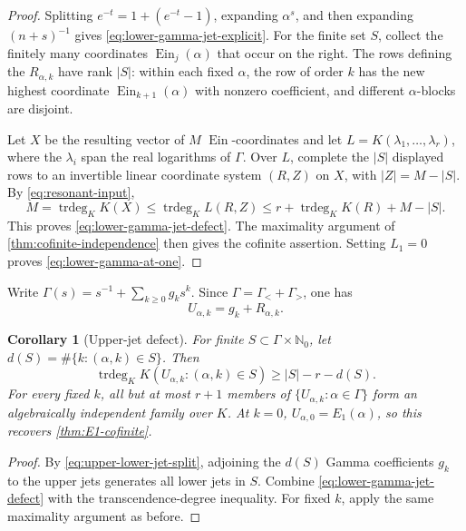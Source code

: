 \documentclass[11pt]{article}
\newtheorem{corollary}[theorem]{Corollary}
\theoremstyle{definition}
\theoremstyle{remark}
\newcommand{\N}{\mathbb N}
\newcommand{\Ein}{\operatorname{Ein}}
\newcommand{\trdeg}{\operatorname{trdeg}}
\begin{document}
\begin{proof}
Splitting \(e^{-t}=1+(e^{-t}-1)\), expanding \(\alpha^s\), and then
expanding \((n+s)^{-1}\) gives \eqref{eq:lower-gamma-jet-explicit}.
For the finite set \(S\), collect the finitely many coordinates
\(\Ein_j(\alpha)\) that occur on the right.  The rows defining the
\(R_{\alpha,k}\) have rank \(|S|\): within each fixed \(\alpha\), the row
of order \(k\) has the new highest coordinate \(\Ein_{k+1}(\alpha)\) with
nonzero coefficient, and different \(\alpha\)-blocks are disjoint.

Let \(X\) be the resulting vector of \(M\) \(\Ein\)-coordinates and let
\(L=K(\lambda_1,\ldots,\lambda_r)\), where the \(\lambda_i\) span the real
logarithms of \(\Gamma\).  Over \(L\), complete the \(|S|\) displayed rows
to an invertible linear coordinate system \((R,Z)\) on \(X\), with
\(|Z|=M-|S|\).  By \eqref{eq:resonant-input},
\[
 M=\trdeg_KK(X)
 \le\trdeg_KL(R,Z)
 \le r+\trdeg_KK(R)+M-|S|.
\]
This proves \eqref{eq:lower-gamma-jet-defect}.  The maximality argument of
\cref{thm:cofinite-independence} then gives the cofinite assertion.
Setting \(L_1=0\) proves \eqref{eq:lower-gamma-at-one}.
\end{proof}

Write \(\Gamma(s)=s^{-1}+\sum_{k\ge0}g_ks^k\).  Since
\(\Gamma=\Gamma_<+\Gamma_>\), one has
\begin{equation}\label{eq:upper-lower-jet-split}
 U_{\alpha,k}=g_k+R_{\alpha,k}.
\end{equation}

\begin{corollary}[Upper-jet defect]
\label{cor:upper-gamma-jets}
For finite \(S\subset\Gamma\times\N_0\), let
\(d(S)=\#\{k:(\alpha,k)\in S\}\).  Then
\begin{equation}\label{eq:upper-gamma-jet-defect}
 \boxed{\displaystyle
 \trdeg_KK(U_{\alpha,k}:(\alpha,k)\in S)
 \ge |S|-r-d(S).}
\end{equation}
For every fixed \(k\), all but at most \(r+1\) members of
\(\{U_{\alpha,k}:\alpha\in\Gamma\}\) form an algebraically independent
family over \(K\).  At \(k=0\), \(U_{\alpha,0}=E_1(\alpha)\), so this
recovers \cref{thm:E1-cofinite}.
\end{corollary}

\begin{proof}
By \eqref{eq:upper-lower-jet-split}, adjoining the \(d(S)\) Gamma
coefficients \(g_k\) to the upper jets generates all lower jets in \(S\).
Combine \eqref{eq:lower-gamma-jet-defect} with the transcendence-degree
inequality.  For fixed \(k\), apply the same maximality argument as before.
\end{proof}
\end{document}
